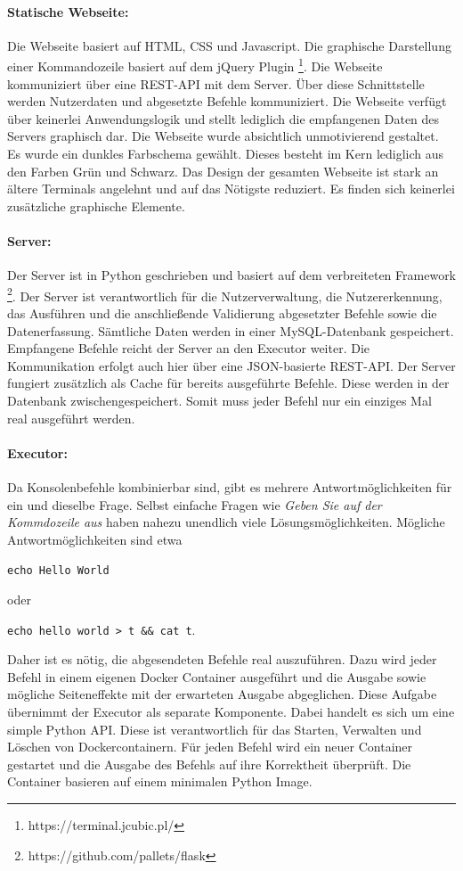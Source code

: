 \paragraph{Statische Webseite:}
Die Webseite basiert auf HTML, CSS und Javascript. Die graphische Darstellung einer Kommandozeile basiert auf dem jQuery Plugin \footnote{https://terminal.jcubic.pl/}. Die Webseite kommuniziert über eine REST-API mit dem Server. Über diese Schnittstelle werden Nutzerdaten und abgesetzte Befehle kommuniziert. Die Webseite verfügt über keinerlei Anwendungslogik und stellt lediglich die empfangenen Daten des Servers graphisch dar. Die Webseite wurde absichtlich unmotivierend gestaltet. Es wurde ein dunkles Farbschema gewählt. Dieses besteht im Kern lediglich aus den Farben Grün und Schwarz. Das Design der gesamten Webseite ist stark an ältere Terminals angelehnt und auf das Nötigste reduziert. Es finden sich keinerlei zusätzliche graphische Elemente.

\paragraph{Server:}
Der Server ist in Python geschrieben und basiert auf dem verbreiteten Framework \footnote{https://github.com/pallets/flask}. Der Server ist verantwortlich für die Nutzerverwaltung, die Nutzererkennung, das Ausführen und die anschließende Validierung abgesetzter Befehle sowie die Datenerfassung. Sämtliche Daten werden in einer MySQL-Datenbank gespeichert. Empfangene Befehle reicht der Server an den Executor weiter. Die Kommunikation erfolgt auch hier über eine JSON-basierte REST-API. Der Server fungiert zusätzlich als Cache für bereits ausgeführte Befehle. Diese werden in der Datenbank zwischengespeichert. Somit muss jeder Befehl nur ein einziges Mal real ausgeführt werden.

\paragraph{Executor:}

  Da Konsolenbefehle kombinierbar sind, gibt es mehrere Antwortmöglichkeiten für ein und dieselbe Frage. Selbst einfache Fragen wie \textit{Geben Sie  auf der Kommdozeile aus} haben nahezu unendlich viele Lösungsmöglichkeiten. Mögliche Antwortmöglichkeiten sind etwa 
  \begin{center}
      \verb|echo Hello World|
  \end{center}
  oder 
   \begin{center}
      \verb|echo hello world > t && cat t|.
  \end{center}
  Daher ist es nötig, die abgesendeten Befehle real auszuführen. Dazu wird jeder Befehl in einem eigenen Docker Container ausgeführt und die Ausgabe sowie mögliche Seiteneffekte mit der erwarteten Ausgabe abgeglichen. Diese Aufgabe übernimmt der Executor als separate Komponente. Dabei handelt es sich um eine simple Python API. Diese ist verantwortlich für das Starten, Verwalten und Löschen von Dockercontainern. Für jeden Befehl wird ein neuer Container gestartet und die Ausgabe des Befehls auf ihre Korrektheit überprüft. Die Container basieren auf einem minimalen Python Image. 


